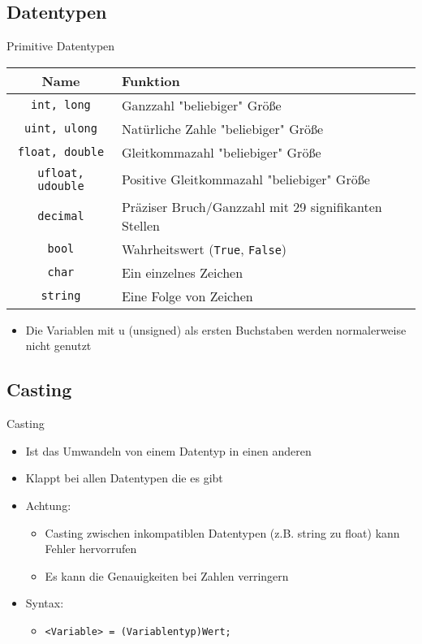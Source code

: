 \subsection{Datentypen}
\begin{frame}{Primitive Datentypen}
	\begin{tabular}{c|l}
		Name & Funktion \\ \hline
		\texttt{int, long} & Ganzzahl "beliebiger" Größe \\
		\texttt{uint, ulong} & Natürliche Zahle "beliebiger" Größe \\
		\texttt{float, double} & Gleitkommazahl "beliebiger" Größe \\
		\texttt{ufloat, udouble} & Positive Gleitkommazahl "beliebiger" Größe \\
        \texttt{decimal} & Präziser Bruch/Ganzzahl mit 29 signifikanten Stellen \\
		\texttt{bool} & Wahrheitswert (\texttt{True}, \texttt{False})\\
        \texttt{char} & Ein einzelnes Zeichen \\
		\texttt{string} & Eine Folge von Zeichen \\
	\end{tabular}
	\begin{itemize}
		 \item Die Variablen mit u (unsigned) als ersten Buchstaben werden normalerweise nicht genutzt
	\end{itemize}
\end{frame}

\subsection{Casting}
\begin{frame}{Casting}
	\begin{itemize}
		\item Ist das Umwandeln von einem Datentyp in einen anderen
		\item Klappt bei allen Datentypen die es gibt
		\item Achtung:
		\begin{itemize}
			\item Casting zwischen inkompatiblen Datentypen (z.B. string zu float) kann Fehler hervorrufen
			\item Es kann die Genauigkeiten bei Zahlen verringern
		\end{itemize}
		\item Syntax:
		\begin{itemize}
			\item \texttt{\alert{<Variable>} = (\alert{Variablentyp})\alert{Wert};}
		\end{itemize}
	\end{itemize}
		
\end{frame}

